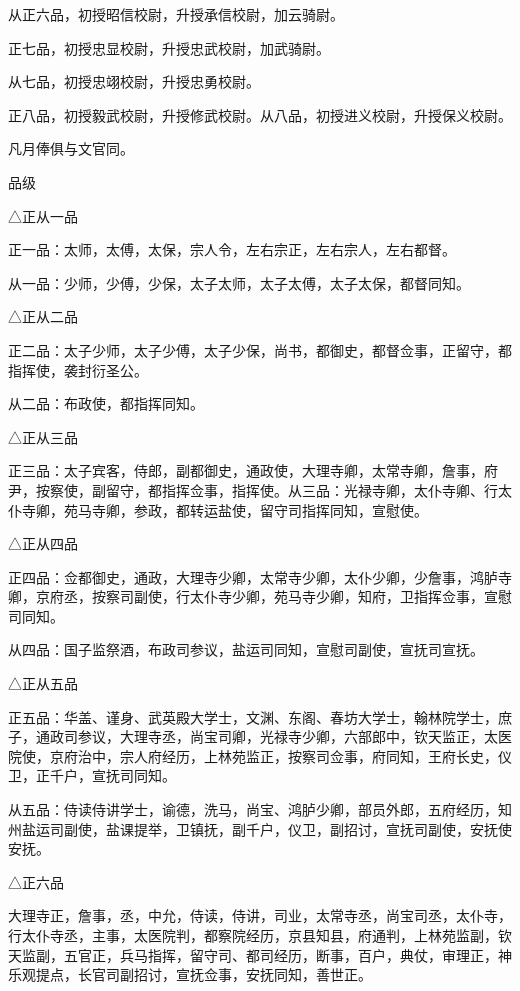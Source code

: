 \documentclass[a4paper,12pt,UTF8,twoside]{ctexbook}
\begin{document}
    从正六品，初授昭信校尉，升授承信校尉，加云骑尉。
    
    正七品，初授忠显校尉，升授忠武校尉，加武骑尉。
    
    从七品，初授忠翊校尉，升授忠勇校尉。
    
    正八品，初授毅武校尉，升授修武校尉。从八品，初授进义校尉，升授保义校尉。
    
    凡月俸俱与文官同。
    
    品级
    
    △正从一品
    
    正一品：太师，太傅，太保，宗人令，左右宗正，左右宗人，左右都督。
    
    从一品：少师，少傅，少保，太子太师，太子太傅，太子太保，都督同知。
    
    △正从二品
    
    正二品：太子少师，太子少傅，太子少保，尚书，都御史，都督佥事，正留守，都指挥使，袭封衍圣公。
    
    从二品：布政使，都指挥同知。
    
    △正从三品
    
    正三品：太子宾客，侍郎，副都御史，通政使，大理寺卿，太常寺卿，詹事，府尹，按察使，副留守，都指挥佥事，指挥使。从三品：光禄寺卿，太仆寺卿、行太仆寺卿，苑马寺卿，参政，都转运盐使，留守司指挥同知，宣慰使。
    
    △正从四品
    
    正四品：佥都御史，通政，大理寺少卿，太常寺少卿，太仆少卿，少詹事，鸿胪寺卿，京府丞，按察司副使，行太仆寺少卿，苑马寺少卿，知府，卫指挥佥事，宣慰司同知。
    
    从四品：国子监祭酒，布政司参议，盐运司同知，宣慰司副使，宣抚司宣抚。
    
    △正从五品
    
    正五品：华盖、谨身、武英殿大学士，文渊、东阁、春坊大学士，翰林院学士，庶子，通政司参议，大理寺丞，尚宝司卿，光禄寺少卿，六部郎中，钦天监正，太医院使，京府治中，宗人府经历，上林苑监正，按察司佥事，府同知，王府长史，仪卫，正千户，宣抚司同知。
    
    从五品：侍读侍讲学士，谕德，洗马，尚宝、鸿胪少卿，部员外郎，五府经历，知州盐运司副使，盐课提举，卫镇抚，副千户，仪卫，副招讨，宣抚司副使，安抚使安抚。
    
    △正六品
    
    大理寺正，詹事，丞，中允，侍读，侍讲，司业，太常寺丞，尚宝司丞，太仆寺，行太仆寺丞，主事，太医院判，都察院经历，京县知县，府通判，上林苑监副，钦天监副，五官正，兵马指挥，留守司、都司经历，断事，百户，典仗，审理正，神乐观提点，长官司副招讨，宣抚佥事，安抚同知，善世正。
    
\end{document}
